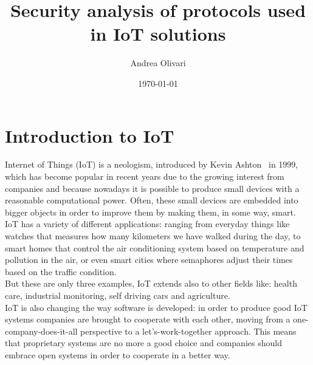 \documentclass[12pt]{report}
\title{\textbf{Security analysis of protocols used in IoT solutions}}
\author{Andrea Olivari}
\date{\today}
\begin{document}
\maketitle
\tableofcontents{}


\chapter{Introduction to IoT}
\bigskip
Internet of Things (IoT) is a neologism, introduced by Kevin Ashton~\cite{kevinashton} in 1999, which has become popular in recent years due to the growing interest from companies and because nowadays it is possible to produce small devices with a reasonable computational power.
Often, these small devices are embedded into bigger objects in order to improve them by making them, in some way, smart.\\

IoT has a variety of different applications: ranging from everyday things like watches that measures how many kilometers we have walked during the day, to smart homes that control the air conditioning system based on temperature and pollution in the air, or even smart cities where semaphores adjust their times based on the traffic condition.\\
But these are only three examples, IoT extends also to other fields like: health care, industrial monitoring, self driving cars and agriculture.\\

IoT is also changing the way software is developed: in order to produce good IoT systems companies are brought to cooperate with each other,
moving from a one-company-does-it-all perspective to a let’s-work-together approach\cite{successiot}.
This means that proprietary systems are no more a good choice and companies should embrace open systems in order to cooperate in a better way.\\
\end{document}
